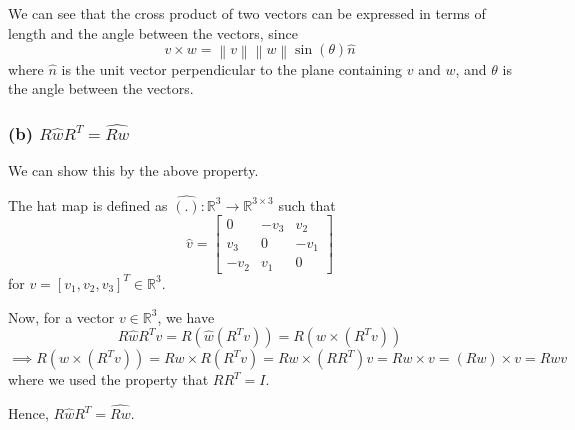 We can see that the cross product of two vectors can be expressed in terms of length and the angle between the vectors, since
\[
    v \times w = \left \| v \right \| \left \| w \right \| \sin(\theta) \hat{n}
\]
where \( \hat{n} \) is the unit vector perpendicular to the plane containing \( v \) and \( w \), and \( \theta \) is the angle between the vectors.

\subsubsection*{(b) \( R \hat{w} R^{T} =\widehat{R w} \)}

We can show this by the above property.

The hat map is defined as \( \hat{(.)}: \mathbb{R}^{3} \rightarrow \mathbb{R}^{3 \times 3} \) such that
\[
    \hat{v} = \begin{bmatrix}
        0      & -v_{3} & v_{2}  \\
        v_{3}  & 0      & -v_{1} \\
        -v_{2} & v_{1}  & 0
    \end{bmatrix}
\]
for \( v = [v_{1}, v_{2}, v_{3}]^{T} \in \mathbb{R}^{3} \).

Now, for a vector \( v \in \mathbb{R}^{3} \), we have
\[
    R \hat{w} R^{T} v
    =
    R (\hat{w} (R^{T} v))
    =
    R (w \times (R^{T} v))
\]
\[
    \implies
    R (w \times (R^{T} v))
    =
    R w \times R(R^{T} v)
    =
    R w \times (RR^{T}) v
    =
    R w \times v
    =
    (R w) \times v
    =
    \widehat{R w} v
\]
where we used the property that \( R R^{T} = I \).

Hence, \( \boxed{ R \hat{w} R^{T} = \widehat{R w} } \).

